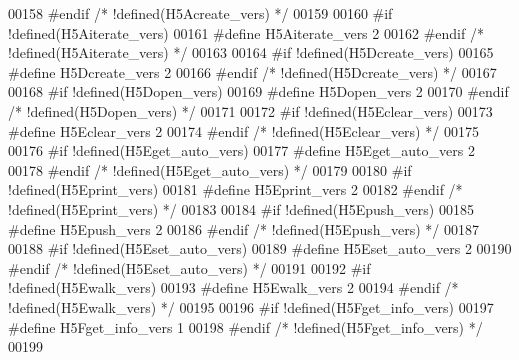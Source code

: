 \begin{DoxyCode}
00158 \textcolor{preprocessor}{#endif }\textcolor{comment}{/* !defined(H5Acreate\_vers) */}\textcolor{preprocessor}{}
00159 
00160 \textcolor{preprocessor}{#if !defined(H5Aiterate\_vers)}
00161 \textcolor{preprocessor}{  #define H5Aiterate\_vers 2}
00162 \textcolor{preprocessor}{#endif }\textcolor{comment}{/* !defined(H5Aiterate\_vers) */}\textcolor{preprocessor}{}
00163 
00164 \textcolor{preprocessor}{#if !defined(H5Dcreate\_vers)}
00165 \textcolor{preprocessor}{  #define H5Dcreate\_vers 2}
00166 \textcolor{preprocessor}{#endif }\textcolor{comment}{/* !defined(H5Dcreate\_vers) */}\textcolor{preprocessor}{}
00167 
00168 \textcolor{preprocessor}{#if !defined(H5Dopen\_vers)}
00169 \textcolor{preprocessor}{  #define H5Dopen\_vers 2}
00170 \textcolor{preprocessor}{#endif }\textcolor{comment}{/* !defined(H5Dopen\_vers) */}\textcolor{preprocessor}{}
00171 
00172 \textcolor{preprocessor}{#if !defined(H5Eclear\_vers)}
00173 \textcolor{preprocessor}{  #define H5Eclear\_vers 2}
00174 \textcolor{preprocessor}{#endif }\textcolor{comment}{/* !defined(H5Eclear\_vers) */}\textcolor{preprocessor}{}
00175 
00176 \textcolor{preprocessor}{#if !defined(H5Eget\_auto\_vers)}
00177 \textcolor{preprocessor}{  #define H5Eget\_auto\_vers 2}
00178 \textcolor{preprocessor}{#endif }\textcolor{comment}{/* !defined(H5Eget\_auto\_vers) */}\textcolor{preprocessor}{}
00179 
00180 \textcolor{preprocessor}{#if !defined(H5Eprint\_vers)}
00181 \textcolor{preprocessor}{  #define H5Eprint\_vers 2}
00182 \textcolor{preprocessor}{#endif }\textcolor{comment}{/* !defined(H5Eprint\_vers) */}\textcolor{preprocessor}{}
00183 
00184 \textcolor{preprocessor}{#if !defined(H5Epush\_vers)}
00185 \textcolor{preprocessor}{  #define H5Epush\_vers 2}
00186 \textcolor{preprocessor}{#endif }\textcolor{comment}{/* !defined(H5Epush\_vers) */}\textcolor{preprocessor}{}
00187 
00188 \textcolor{preprocessor}{#if !defined(H5Eset\_auto\_vers)}
00189 \textcolor{preprocessor}{  #define H5Eset\_auto\_vers 2}
00190 \textcolor{preprocessor}{#endif }\textcolor{comment}{/* !defined(H5Eset\_auto\_vers) */}\textcolor{preprocessor}{}
00191 
00192 \textcolor{preprocessor}{#if !defined(H5Ewalk\_vers)}
00193 \textcolor{preprocessor}{  #define H5Ewalk\_vers 2}
00194 \textcolor{preprocessor}{#endif }\textcolor{comment}{/* !defined(H5Ewalk\_vers) */}\textcolor{preprocessor}{}
00195 
00196 \textcolor{preprocessor}{#if !defined(H5Fget\_info\_vers)}
00197 \textcolor{preprocessor}{  #define H5Fget\_info\_vers 1}
00198 \textcolor{preprocessor}{#endif }\textcolor{comment}{/* !defined(H5Fget\_info\_vers) */}\textcolor{preprocessor}{}
00199 

\end{DoxyCode}
